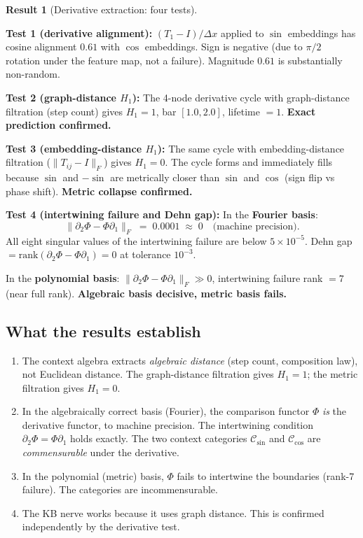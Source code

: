 \documentclass[11pt]{amsart}
\theoremstyle{definition}
\newtheorem{result}[theorem]{Result}
\begin{document}
\begin{result}[Derivative extraction: four tests]
\label{result:derivative}

\noindent\textbf{Test 1 (derivative alignment):}
$(T_1 - I)/\Delta x$ applied to $\sin$ embeddings has cosine alignment $0.61$
with $\cos$ embeddings. Sign is negative (due to $\pi/2$ rotation under the
feature map, not a failure). Magnitude $0.61$ is substantially non-random.

\noindent\textbf{Test 2 (graph-distance $H_1$):}
The 4-node derivative cycle with graph-distance filtration (step count)
gives $H_1 = 1$, bar $[1.0, 2.0]$, lifetime $= 1$.
\textbf{Exact prediction confirmed.}

\noindent\textbf{Test 3 (embedding-distance $H_1$):}
The same cycle with embedding-distance filtration ($\|T_{ij}-I\|_F$)
gives $H_1 = 0$.
The cycle forms and immediately fills because $\sin$ and $-\sin$ are metrically
closer than $\sin$ and $\cos$ (sign flip vs phase shift).
\textbf{Metric collapse confirmed.}

\noindent\textbf{Test 4 (intertwining failure and Dehn gap):}
In the \textbf{Fourier basis}:
\[
  \|\partial_2 \Phi - \Phi \partial_1\|_F \;=\; 0.0001 \;\approx\; 0 \quad\text{(machine precision).}
\]
All eight singular values of the intertwining failure are below $5 \times 10^{-5}$.
Dehn gap $= \mathrm{rank}(\partial_2\Phi - \Phi\partial_1) = 0$ at tolerance $10^{-3}$.

In the \textbf{polynomial basis}:
$\|\partial_2\Phi - \Phi\partial_1\|_F \gg 0$, intertwining failure rank $= 7$ (near full rank).
\textbf{Algebraic basis decisive, metric basis fails.}
\end{result}

\subsection{What the results establish}

\begin{enumerate}
\item The context algebra extracts \emph{algebraic distance} (step count, composition law),
  not Euclidean distance. The graph-distance filtration gives $H_1=1$; the metric filtration
  gives $H_1=0$.
\item In the algebraically correct basis (Fourier), the comparison functor $\Phi$
  \emph{is} the derivative functor, to machine precision.
  The intertwining condition $\partial_2\Phi = \Phi\partial_1$ holds exactly.
  The two context categories $\mathcal{C}_{\sin}$ and $\mathcal{C}_{\cos}$ are
  \emph{commensurable} under the derivative.
\item In the polynomial (metric) basis, $\Phi$ fails to intertwine the boundaries
  (rank-7 failure). The categories are incommensurable.
\item The KB nerve works because it uses graph distance.
  This is confirmed independently by the derivative test.
\end{enumerate}
\end{document}
